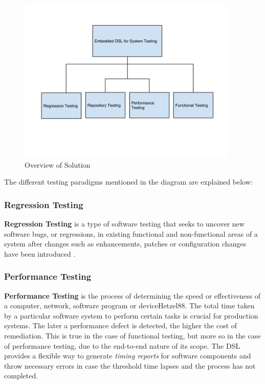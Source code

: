 \begin{figure}[H]
  \centering
    \includegraphics[width=400px]{figures/overview_of_solution.png}
  \caption{Overview of Solution}
\end{figure}

\noindent
The different testing paradigms mentioned in the diagram are explained below:
\subsubsection{Regression Testing}

\textbf{Regression Testing} is a type of software testing that seeks to uncover new software bugs, or regressions, in existing functional and non-functional areas of a system after changes such as enhancements, patches or configuration changes have been introduced \cite{Hetzel88}.
\bigskip

\subsubsection{Performance Testing}

\textbf{Performance Testing} is the process of determining the speed or effectiveness of a computer, network, software program or device{Hetzel88}. The total time taken by a particular software system to perform certain tasks is crucial for production systems. The later a performance defect is detected, the higher the cost of remediation. This is true in the case of functional testing, but more so in the case of performance testing, due to the end-to-end nature of its scope. The DSL provides a flexible way to generate \textit{timing reports} for software components and throw necessary errors in case the threshold time lapses and the process has not completed.


